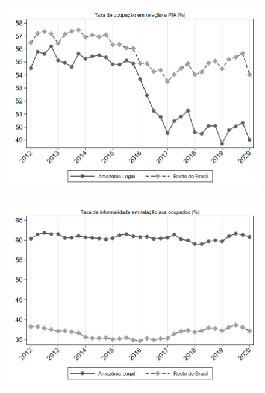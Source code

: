 \begin{frame}[label=_estrutura_emprego_taxa_de_ocupacao]{}
\textit{\hyperlink{_estrutura_emprego}{}}
\begin{figure}
  \centering
  \includegraphics[width=1\linewidth]{../../analysis/output/estrutura_emprego/_estrutura_emprego_taxa_de_ocupacao.png}
  \caption{}
  \label{fig:_estrutura_emprego_taxa_de_ocupacao}
\end{figure}
\end{frame}

\begin{frame}[label=_estrutura_emprego_taxa_de_informalidade]{}
\textit{\hyperlink{_estrutura_emprego}{}}
\begin{figure}
  \centering
  \includegraphics[width=1.0\linewidth]{../../analysis/output/estrutura_emprego/_estrutura_emprego_taxa_de_informalidade.png}
  \caption{}
  \label{fig:_estrutura_emprego_taxa_de_informalidade}
\end{figure}
\end{frame}


